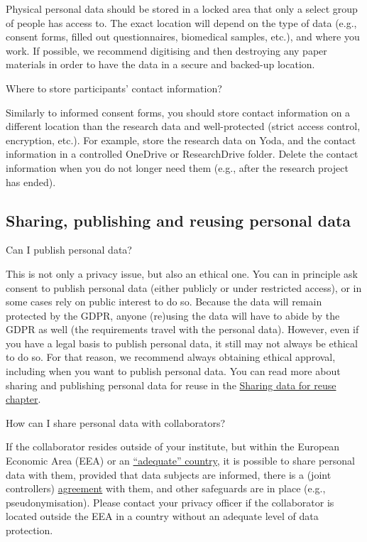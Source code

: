 \documentclass[
]{book}
\begin{document}
Physical personal data should be stored in a locked area that only a select group of people has access to. The exact location will depend on the type of data (e.g., consent forms, filled out questionnaires, biomedical samples, etc.), and where you work. If possible, we recommend digitising and then destroying any paper materials in order to have the data in a secure and backed-up location.

Where to store participants' contact information?

Similarly to informed consent forms, you should store contact information on a different location than the research data and well-protected (strict access control, encryption, etc.). For example, store the research data on Yoda, and the contact information in a controlled OneDrive or ResearchDrive folder. Delete the contact information when you do not longer need them (e.g., after the research project has ended).

\hypertarget{sharing}{%
\subsection{Sharing, publishing and reusing personal data}\label{sharing}}

Can I publish personal data?

This is not only a privacy issue, but also an ethical one. You can in principle ask consent to publish personal data (either publicly or under restricted access), or in some cases rely on public interest to do so. Because the data will remain protected by the GDPR, anyone (re)using the data will have to abide by the GDPR as well (the requirements travel with the personal data). However, even if you have a legal basis to publish personal data, it still may not always be ethical to do so. For that reason, we recommend always obtaining ethical approval, including when you want to publish personal data. You can read more about sharing and publishing personal data for reuse in the \protect\hyperlink{data-sharing-reuse}{Sharing data for reuse chapter}.

How can I share personal data with collaborators?

If the collaborator resides outside of your institute, but within the European Economic Area (EEA) or an \href{https://ec.europa.eu/info/law/law-topic/data-protection/international-dimension-data-protection/adequacy-decisions_en}{``adequate'' country}, it is possible to share personal data with them, provided that data subjects are informed, there is a (joint controllers) \protect\hyperlink{agreements}{agreement} with them, and other safeguards are in place (e.g., pseudonymisation). Please contact your privacy officer if the collaborator is located outside the EEA in a country without an adequate level of data protection.
\end{document}
